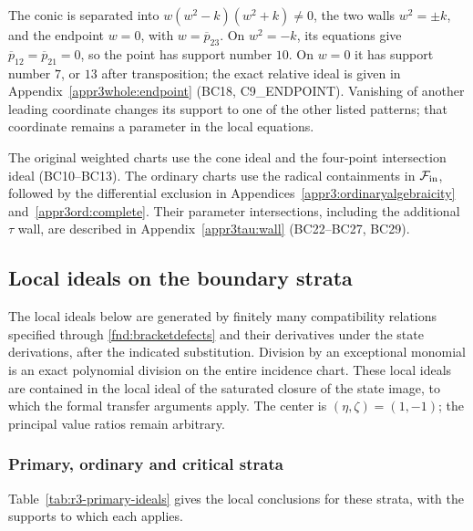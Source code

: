 \documentclass[11pt,a4paper]{article}
\numberwithin{equation}{section}
\theoremstyle{plain}
\theoremstyle{definition}
\theoremstyle{remark}
\begin{document}
The conic is separated into $w(w^2-k)(w^2+k)\ne0$, the two walls
$w^2=\pm k$, and the endpoint $w=0$, with
$w=\overline p_{23}$. On $w^2=-k$, its equations give
$\overline p_{12}=\overline p_{21}=0$, so the point has support number $10$. On $w=0$ it has
support number $7$, or $13$ after transposition; the exact relative
ideal is given in Appendix~\ref{appr3whole:endpoint}
(BC18, C9\_ENDPOINT). Vanishing of another leading coordinate
changes its support to one of the other listed patterns; that
coordinate remains a parameter in the local equations.

The original weighted charts use the cone ideal and the four-point
intersection ideal (BC10--BC13). The ordinary charts use the radical
containments in $\mathcal F_{\rm in}$, followed by the differential
exclusion in Appendices~\ref{appr3:ordinaryalgebraicity}
and~\ref{appr3ord:complete}. Their parameter intersections,
including the additional $\tau$ wall, are described in
Appendix~\ref{appr3tau:wall} (BC22--BC27, BC29).

\subsection{Local ideals on the boundary strata}\label{r3:boundarysources}
The local ideals below are generated by finitely many compatibility relations
specified through \eqref{fnd:bracketdefects} and their derivatives under the state derivations,
after the indicated substitution. Division by an exceptional monomial is an exact polynomial division
on the entire incidence chart.
These local ideals are contained in the local ideal of the saturated closure of the state image, to which the formal transfer arguments apply.
The center is $(\eta ,\zeta )=(1,-1)$; the principal value ratios remain arbitrary.

\subsubsection{Primary, ordinary and critical strata}\label{r3:primary-supports}

Table~\ref{tab:r3-primary-ideals} gives the local conclusions
for these strata, with the supports to which each applies.
\end{document}
